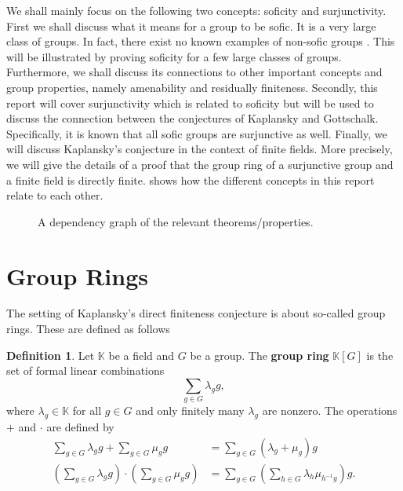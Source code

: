 \documentclass[titlepage, a4paper]{article}
\newcommand{\F}{\mathbb{F}}
\theoremstyle{theoremdd}
\theoremstyle{definition}
\newtheorem{definition}[theorem]{Definition}
\theoremstyle{remark}
\begin{document}
We shall mainly focus on the following two concepts: soficity and surjunctivity. First we shall discuss what it means for a group to be sofic. It is a very large class of groups. In fact, there exist no known examples of non-sofic groups \cite[introduction]{weiss_2000}. This will be illustrated by proving soficity for a few large classes of groups. Furthermore, we shall discuss its connections to other important concepts and group properties, namely amenability and residually finiteness. Secondly, this report will cover surjunctivity which is related to soficity but will be used to discuss the connection between the conjectures of Kaplansky and Gottschalk. Specifically, it is known that all sofic groups are surjunctive as well.
Finally, we will discuss Kaplansky's conjecture in the context of finite fields. More precisely, we will give the details of a proof that the group ring of a surjunctive group and a finite field is directly finite.  shows how the different concepts in this report relate to each other.


\begin{figure}[h]
	\centering
{}
\caption{A dependency graph of the relevant theorems/properties. }
\label{fig:dependency_graph}
\end{figure}
\section{Group Rings}\label{sec:group_rings} 

The setting of Kaplansky's direct finiteness conjecture is about so-called group rings. These are defined as follows


\begin{definition}\label{def:group_ring}
	Let $\mathbb K$ be a field and $G$ be a group. The \textbf{group ring} $\mathbb K[G]$ is the set of formal linear combinations
    \[
        \sum_{g \in G} \lambda_g g,
    \]
    where $\lambda_g \in \mathbb K$ for all $g \in G$ and only finitely many $\lambda_g$ are nonzero. The operations $+$ and $\cdot$ are defined by
    \begin{align*}
        \sum_{g \in G} \lambda_g g + \sum_{g \in G} \mu_g g
        &= \sum_{g \in G} (\lambda_g+\mu_g) g \\
        \left(\sum_{g \in G} \lambda_g g \right) \cdot \left(\sum_{g \in G} \mu_g g \right)
        &= \sum_{g \in G} \left( \sum_{h \in G} \lambda_{h} \mu_{h^{-1}g} \right) g.
    \end{align*}
\end{definition}
\end{document}
